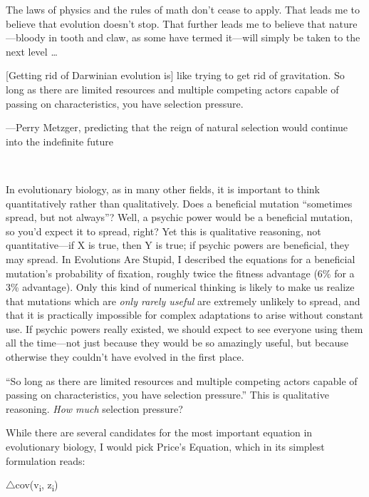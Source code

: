 {
 The laws of physics and the rules of math don't
cease to apply. That leads me to believe that evolution
doesn't stop. That further leads me to believe that
nature---bloody in tooth and claw, as some have termed it---will simply
be taken to the next level \ldots}

{
 [Getting rid of Darwinian evolution is] like trying to get rid of
gravitation. So long as there are limited resources and multiple
competing actors capable of passing on characteristics, you have
selection pressure.}

{\raggedleft
 {}---Perry Metzger, predicting that the reign of natural selection
would continue into the indefinite future
\par}


\bigskip

{
 ~}

{
 In evolutionary biology, as in many other fields, it is important
to think quantitatively rather than qualitatively. Does a beneficial
mutation ``sometimes spread, but not
always''? Well, a psychic power would be a beneficial
mutation, so you'd expect it to spread, right? Yet this
is qualitative reasoning, not quantitative---if X is true, then Y is
true; if psychic powers are beneficial, they may spread. In Evolutions
Are Stupid, I described the equations for a beneficial
mutation's probability of fixation, roughly twice the
fitness advantage (6\% for a 3\% advantage). Only this kind of
numerical thinking is likely to make us realize that mutations which
are \textit{only rarely useful} are extremely unlikely to spread, and
that it is practically impossible for complex adaptations to arise
without constant use. If psychic powers really existed, we should
expect to see everyone using them all the time---not just because they
would be so amazingly useful, but because otherwise they
couldn't have evolved in the first place.}

{
 ``So long as there are limited resources and
multiple competing actors capable of passing on characteristics, you
have selection pressure.'' This is qualitative
reasoning. \textit{How much} selection pressure?}

{
 While there are several candidates for the most important equation
in evolutionary biology, I would pick Price's Equation,
which in its simplest formulation reads:}

{\centering
 ${\triangle}$cov(v\textsubscript{i}, z\textsubscript{i})
\par}


\bigskip


